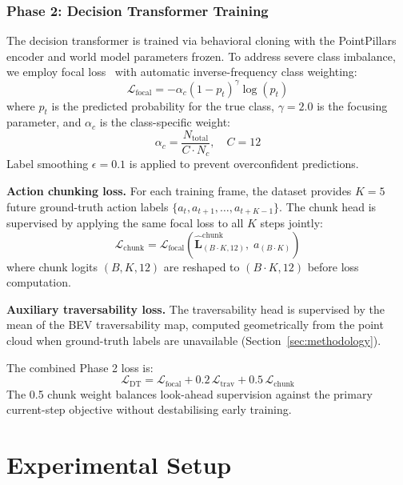 \documentclass[journal]{IEEEtran}
\begin{document}
\subsubsection{Phase 2: Decision Transformer Training}
The decision transformer is trained via behavioral cloning with the PointPillars encoder and world model parameters frozen. To address severe class imbalance, we employ focal loss~\cite{lin2017} with automatic inverse-frequency class weighting:
\begin{equation}
    \mathcal{L}_\text{focal} = -\alpha_c (1 - p_t)^\gamma \log(p_t)
\end{equation}
where $p_t$ is the predicted probability for the true class, $\gamma{=}2.0$ is the focusing parameter, and $\alpha_c$ is the class-specific weight:
\begin{equation}
    \alpha_c = \frac{N_\text{total}}{C \cdot N_c}, \quad C = 12
\end{equation}
Label smoothing $\epsilon{=}0.1$ is applied to prevent overconfident predictions.

\textbf{Action chunking loss.}
For each training frame, the dataset provides $K{=}5$ future ground-truth action labels $\{a_t, a_{t+1}, \ldots, a_{t+K-1}\}$. The chunk head is supervised by applying the same focal loss to all $K$ steps jointly:
\begin{equation}
    \mathcal{L}_\text{chunk} = \mathcal{L}_\text{focal}\!\left(\hat{\mathbf{L}}^\text{chunk}_{(B \cdot K, 12)},\; a_{(B \cdot K)}\right)
\end{equation}
where chunk logits $(B, K, 12)$ are reshaped to $(B{\cdot}K, 12)$ before loss computation.

\textbf{Auxiliary traversability loss.}
The traversability head is supervised by the mean of the BEV traversability map, computed geometrically from the point cloud when ground-truth labels are unavailable (Section~\ref{sec:methodology}).

The combined Phase 2 loss is:
\begin{equation}
    \mathcal{L}_\text{DT} = \mathcal{L}_\text{focal} + 0.2\,\mathcal{L}_\text{trav} + 0.5\,\mathcal{L}_\text{chunk}
\end{equation}
The 0.5 chunk weight balances look-ahead supervision against the primary current-step objective without destabilising early training.

\section{Experimental Setup}
\label{sec:experiments}
\end{document}
